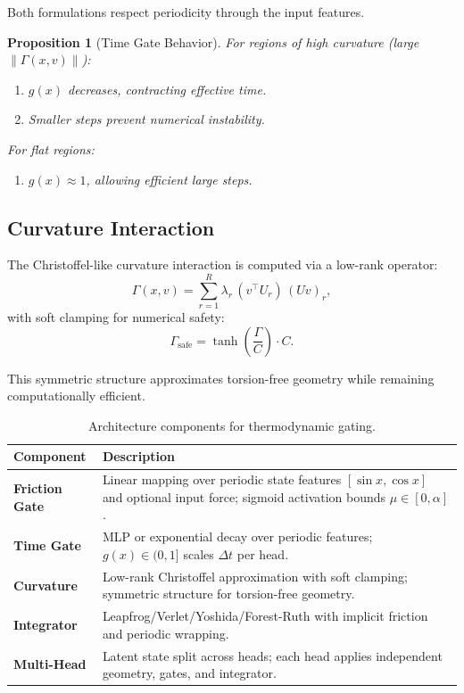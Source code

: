 \documentclass[12pt,letterpaper,twoside]{article}
\newtheorem{prop}{Proposition}[section]
\begin{document}
Both formulations respect periodicity through the input features.

\begin{prop}[Time Gate Behavior]
For regions of high curvature (large $\|\Gamma(x,v)\|$):
\begin{enumerate}
\item $g(x)$ decreases, contracting effective time.
\item Smaller steps prevent numerical instability.
\end{enumerate}
For flat regions:
\begin{enumerate}
\item $g(x) \approx 1$, allowing efficient large steps.
\end{enumerate}
\end{prop}

\subsection{Curvature Interaction}

The Christoffel-like curvature interaction is computed via a low-rank operator:
\[
\Gamma(x,v) = \sum_{r=1}^{R} \lambda_r \, (v^\top U_r) \, (U v)_r,
\]
with soft clamping for numerical safety:
\[
\Gamma_{\text{safe}} = \tanh\left(\frac{\Gamma}{C}\right) \cdot C.
\]

This symmetric structure approximates torsion-free geometry while remaining computationally efficient.

\begin{table}[htbp]
\centering
\begin{tabular}{lp{}}
\toprule
Component & Description \\
\midrule
\textbf{Friction Gate} & Linear mapping over periodic state features $[\sin x, \cos x]$ and optional input force; sigmoid activation bounds $\mu \in [0, \alpha]$. \\
\midrule
\textbf{Time Gate} & MLP or exponential decay over periodic features; $g(x) \in (0,1]$ scales $\Delta t$ per head. \\
\midrule
\textbf{Curvature} & Low-rank Christoffel approximation with soft clamping; symmetric structure for torsion-free geometry. \\
\midrule
\textbf{Integrator} & Leapfrog/Verlet/Yoshida/Forest-Ruth with implicit friction and periodic wrapping. \\
\midrule
\textbf{Multi-Head} & Latent state split across heads; each head applies independent geometry, gates, and integrator. \\
\bottomrule
\end{tabular}
\caption{Architecture components for thermodynamic gating.}
\label{tab:architecture}
\end{table}
\end{document}

